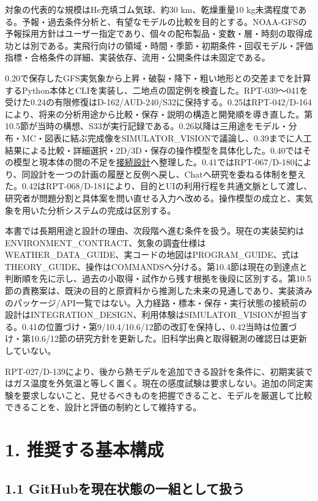 \documentclass[11pt,a4paper]{article}
\begin{document}
対象の代表的な規模はHe充填ゴム気球、約30 km、乾燥重量10
kg未満程度である。予報・過去条件分析と、有望なモデルの比較を目的とする。NOAA-GFSの予報採用方針はユーザー指定であり、個々の配布製品・変数・層・時刻の取得成功とは別である。実飛行向けの領域・時間・季節・初期条件・回収モデル・評価指標・合格条件の詳細、実装依存、流用・公開条件は未固定である。

0.20で保存したGFS実気象から上昇・破裂・降下・粗い地形との交差までを計算するPython本体とCLIを実装し、二地点の固定例を検査した。RPT-039〜041を受けた0.24の有限修復はD-162/AUD-240/S32に保持する。0.25はRPT-042/D-164により、将来の分析用途から比較・保存・説明の構造と開発順を導き直した。第10.5節が当時の構想、S33が実行記録である。0.26以降は三用途をモデル・分布・MC・図表に結ぶ完成像をSIMULATOR\_VISIONで議論し、0.39までに人工結果による比較・詳細選択・2D/3D・保存の操作模型を具体化した。0.40ではその模型と現本体の間の不足を\href{INTEGRATION_DESIGN.html}{接続設計}へ整理した。0.41ではRPT-067/D-180により、同設計を一つの計画の履歴と反例へ戻し、Chatへ研究を委ねる体制を整えた。0.42はRPT-068/D-181により、目的とUIの利用行程を共通文脈として渡し、研究者が問題分割と具体案を問い直せる入力へ改める。操作模型の成立と、実気象を用いた分析システムの完成は区別する。

本書では長期用途と設計の理由、次段階へ進む条件を扱う。現在の実装契約はENVIRONMENT\_CONTRACT、気象の調査仕様はWEATHER\_DATA\_GUIDE、実コードの地図はPROGRAM\_GUIDE、式はTHEORY\_GUIDE、操作はCOMMANDSへ分ける。第10.4節は現在の到達点と判断順を先に示し、過去の小取得・試作から残す根拠を後段に区別する。第10.5節の責務案は、既決の目的と原資料から推測した未来の見通しであり、実装済みのパッケージ/API一覧ではない。入力経路・標本・保存・実行状態の接続前の設計はINTEGRATION\_DESIGN、利用体験はSIMULATOR\_VISIONが担当する。0.41の位置づけ・第9/10.4/10.6/12節の改訂を保持し、0.42当時は位置づけ・第10.6/12節の研究方針を更新した。旧科学出典と取得観測の確認日は更新していない。

RPT-027/D-139により、後から熱モデルを追加できる設計を条件に、初期実装ではガス温度を外気温と等しく置く。現在の感度試験は要求しない。追加の同定実験を要求しないこと、見せるべきものを把握できること、モデルを厳選して比較できることを、設計と評価の制約として維持する。

\section{1.
推奨する基本構成}\label{ux63a8ux5968ux3059ux308bux57faux672cux69cbux6210}

\subsection{1.1
GitHubを現在状態の一組として扱う}\label{githubux3092ux73feux5728ux72b6ux614bux306eux4e00ux7d44ux3068ux3057ux3066ux6271ux3046}
\end{document}
